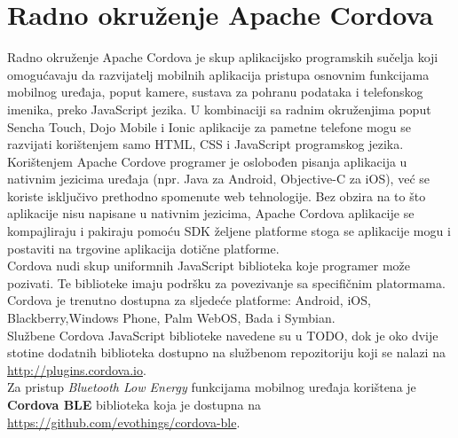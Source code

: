 \chapter{Radno okruženje Apache Cordova}
Radno okruženje Apache Cordova je skup aplikacijsko programskih sučelja  koji omogućavaju da razvijatelj mobilnih aplikacija pristupa osnovnim funkcijama mobilnog uređaja, poput kamere, sustava za pohranu podataka i telefonskog imenika, preko JavaScript jezika. 
U kombinaciji sa radnim okruženjima poput Sencha Touch, Dojo Mobile i Ionic aplikacije za pametne telefone mogu se razvijati korištenjem samo HTML, CSS i JavaScript programskog jezika.
\\

Korištenjem Apache Cordove programer je oslobođen pisanja aplikacija u nativnim jezicima uređaja (npr. Java za Android, Objective-C za iOS), već se koriste isključivo prethodno spomenute web tehnologije. 
Bez obzira na to što aplikacije nisu napisane u nativnim jezicima, Apache Cordova aplikacije se kompajliraju i pakiraju pomoću SDK  željene platforme stoga se aplikacije mogu i postaviti na trgovine aplikacija  dotične platforme. 
\\

Cordova nudi skup uniformnih JavaScript biblioteka koje programer može pozivati. 
Te biblioteke imaju podršku za povezivanje sa specifičnim platormama. Cordova je trenutno dostupna za sljedeće platforme: Android, iOS, Blackberry,Windows Phone, Palm WebOS, Bada i Symbian.
\\
Službene Cordova JavaScript biblioteke navedene su u TODO, dok je oko dvije stotine dodatnih biblioteka dostupno na službenom repozitoriju koji se nalazi na \url{http://plugins.cordova.io}.
\\
Za pristup \textit{Bluetooth Low Energy} funkcijama mobilnog uređaja korištena je \textbf{Cordova BLE} biblioteka koja je dostupna na \url{https://github.com/evothings/cordova-ble}.

